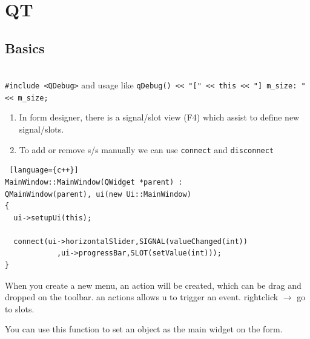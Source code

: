\chapter{QT}
\section{Basics}
\begin{note}\\
\verb|#include <QDebug>| and usage like \verb|qDebug() << "[" << this << "] m_size: " << m_size;|
\end{note}

\begin{note}
\begin{enumerate}
\item In form designer, there is a signal/slot view (F4) which assist to define new signal/slots.
\item To add or remove s/s manually we can use \verb|connect| and \verb|disconnect|
\end{enumerate}
\begin{lstlisting} [language={c++}]
MainWindow::MainWindow(QWidget *parent) :
QMainWindow(parent), ui(new Ui::MainWindow)
{
  ui->setupUi(this);

  connect(ui->horizontalSlider,SIGNAL(valueChanged(int))
            ,ui->progressBar,SLOT(setValue(int)));
}
\end{lstlisting}
\end{note}

\begin{note}[Actions]
	
When you create a new menu, an action will be created, which can be drag and dropped on the toolbar. an actions allows u to trigger an event. rightclick $\rightarrow$ go to slots.
\end{note}

\begin{note}
	
	You can use this function to set an object as the main widget on the form.
\end{note}

